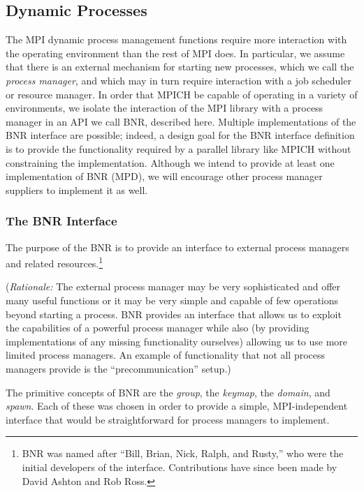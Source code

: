 \documentclass{article}
\begin{document}
\subsection{Dynamic Processes}
\label{sec:spawn}

The MPI dynamic process management functions require more interaction with the
operating environment than the rest of MPI does.  In particular, we assume
that there is an external mechanism for starting new processes, which we call
the {\em process manager}, and which may in turn require interaction with a
job scheduler or resource manager.  In order that MPICH be capable of
operating in a variety of environments, we isolate the interaction of the MPI
library with a process manager in an API we call BNR, described here.
Multiple implementations of the BNR interface are possible;  indeed, a
design goal for the BNR interface definition is to provide the functionality
required by a parallel library like MPICH without constraining the
implementation.  Although we intend to provide at least one implementation of
BNR (MPD), we will encourage other process manager suppliers to implement it
as well.

\subsubsection{The BNR Interface}
\label{sec:bnr}

The purpose of the BNR is to provide an interface to external process
managers and related resources.\footnote{BNR was named after ``Bill,
Brian, Nick, Ralph, and Rusty,'' who were the initial developers of
the interface.  Contributions have since been made by David Ashton and
Rob Ross.}

({\em Rationale:\/} The external process manager may be
very sophisticated and offer many useful functions or it may be very
simple and capable of few operations beyond starting a process.
BNR provides an interface that allows us to exploit the
capabilities of a powerful process manager while also (by providing
implementations of any missing functionality ourselves) allowing us to
use more limited process managers.  An example of functionality that
not all process managers provide is the ``precommunication'' setup.)

The primitive concepts of BNR are the {\em group}, the {\em keymap}, 
the {\em domain}, and {\em spawn}.  Each of these was chosen in 
order to provide a simple, MPI-independent interface that would be 
straightforward for process managers to implement.
\end{document}
